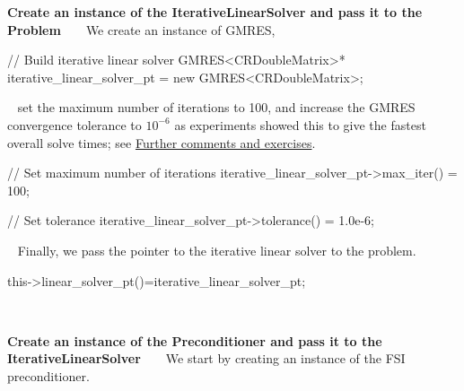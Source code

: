 \begin{DoxyEnumerate}
\item {\bfseries Create an instance of the Iterative\+Linear\+Solver and pass it to the Problem} ~\newline
~\newline
 We create an instance of {\ttfamily G\+M\+R\+ES}, ~\newline
~\newline
  
\begin{DoxyCodeInclude}
   \textcolor{comment}{// Build iterative linear solver}
   GMRES<CRDoubleMatrix>* iterative\_linear\_solver\_pt = 
     \textcolor{keyword}{new} GMRES<CRDoubleMatrix>;

\end{DoxyCodeInclude}
 ~\newline
 set the maximum number of iterations to 100, and increase the G\+M\+R\+ES convergence tolerance to $ 10^{-6} $ as experiments showed this to give the fastest overall solve times; see \hyperlink{index_comm_ex}{Further comments and exercises}. ~\newline
~\newline
 
\begin{DoxyCodeInclude}
   
   \textcolor{comment}{// Set maximum number of iterations}
   iterative\_linear\_solver\_pt->max\_iter() = 100;
   
   \textcolor{comment}{// Set tolerance}
   iterative\_linear\_solver\_pt->tolerance() = 1.0e-6;   

\end{DoxyCodeInclude}
 ~\newline
 Finally, we pass the pointer to the iterative linear solver to the problem.~\newline
~\newline
 
\begin{DoxyCodeInclude}
     this->linear\_solver\_pt()=iterative\_linear\_solver\_pt;

\end{DoxyCodeInclude}
 ~\newline
~\newline

\item {\bfseries Create an instance of the Preconditioner and pass it to the Iterative\+Linear\+Solver} ~\newline
~\newline
 We start by creating an instance of the F\+SI preconditioner. ~\newline
~\newline
 

\end{DoxyEnumerate}
